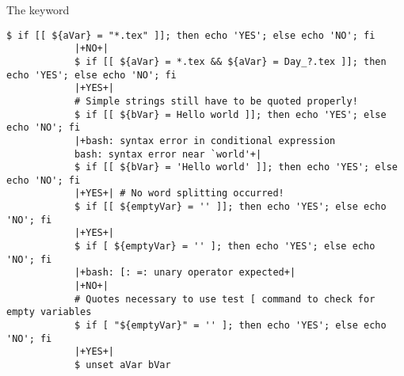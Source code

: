 \begin{frame}[fragile]{The \bash{[[} keyword}
\begin{onlyenv}
\begin{lstlisting}[style=MyBash, style=oddnumbers, style=smaller, xleftmargin=1mm, xrightmargin=1mm]
            $ if [[ ${aVar} = "*.tex" ]]; then echo 'YES'; else echo 'NO'; fi
            |+NO+|
            $ if [[ ${aVar} = *.tex && ${aVar} = Day_?.tex ]]; then echo 'YES'; else echo 'NO'; fi
            |+YES+|
            # Simple strings still have to be quoted properly!
            $ if [[ ${bVar} = Hello world ]]; then echo 'YES'; else echo 'NO'; fi
            |+bash: syntax error in conditional expression
            bash: syntax error near `world'+|
            $ if [[ ${bVar} = 'Hello world' ]]; then echo 'YES'; else echo 'NO'; fi
            |+YES+| # No word splitting occurred!
            $ if [[ ${emptyVar} = '' ]]; then echo 'YES'; else echo 'NO'; fi
            |+YES+|
            $ if [ ${emptyVar} = '' ]; then echo 'YES'; else echo 'NO'; fi
            |+bash: [: =: unary operator expected+|
            |+NO+|
            # Quotes necessary to use test [ command to check for empty variables
            $ if [ "${emptyVar}" = '' ]; then echo 'YES'; else echo 'NO'; fi
            |+YES+|
            $ unset aVar bVar
        \end{lstlisting}
    \end{onlyenv}
\end{frame}
